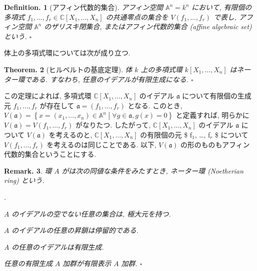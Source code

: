 \documentclass[openany, a4paper, oneside]{jsbook}
\newcounter{enum2}
\renewenvironment{enumerate}{%
\begin{list}%
{%
\arabic{enum2}.\ \,%
}%
{%
\usecounter{enum2}
\setlength{\itemindent}{0pt}%
\setlength{\leftmargin}{15pt}%
\setlength{\rightmargin}{0pt}%
\setlength{\labelsep}{0pt}%
\setlength{\labelwidth}{6pt}%
\setlength{\itemsep}{0pt}%
\setlength{\parsep}{0pt}%
\setlength{\listparindent}{0pt}%
}
}{%
\end{list}%
}
\theoremstyle{break}
\newtheorem{thm}{Theorem.}[section]
\theoremstyle{breakdefn}
\newtheorem{defn}[thm]{Definition.}
\newtheorem{rem}[thm]{Remark.}
\newcommand{\relmiddle}[1]{\mathrel{}\middle#1\mathrel{}}
\newcommand{\set}[2]{\left\{#1 \relmiddle| #2\right\}}
\newcommand{\fin}{\hfill $\square$ \par}
\begin{document}
\begin{defn}[アフィン代数的集合]
アフィン空間 $\mathbb{A}^n = k^n$ において,
有限個の多項式 $f_1, \dots, f_r \in \mathbb{C}[X_1, \dots, X_n]$ の共通零点の集合を
$V (f_1, \dots, f_r)$ で表し, アフィン空間 $\mathbb{A}^n$ のザリスキ閉集合,
またはアフィン代数的集合 (affine algebraic set) という. \fin
\end{defn}\label{waheyhey-algebraic-geometry-guidance2}
体上の多項式環については次が成り立つ.
\begin{thm}[ヒルベルトの基底定理]
体 $k$ 上の多項式環 $k[X_1, \dots, X_n]$ はネーター環である.
すなわち, 任意のイデアルが有限生成になる. \fin
\end{thm}
この定理によれば, 多項式環 $\mathbb{C}[X_1, \dots, X_n]$ のイデアル $\mathfrak{a}$
について有限個の生成元 ${f_1, \dots, f_r}$ が存在して $\mathfrak{a}=(f_1, \dots, f_r)$ となる.
このとき, $V (\mathfrak{a}) = \set{x = (x_1, \dots, x_n) \in \mathbb{A}^n}{\forall g \in \mathfrak{a}, g (x)=0}$
と定義すれば, 明らかに $V ( \mathfrak{a} ) = V (f_1, \dots, f_r)$ がなりたつ.
したがって, $\mathbb{C}[X_1, \dots, X_n]$ のイデアル $\mathfrak{a}$ について $V ( \mathfrak{a} )$ を考えるのと,
$\mathbb{C}[X_1, \dots, X_n]$ の有限個の元 \$ f$_1$, \dots{}, f$_r$ \$ について $V (f_1, \dots, f_r)$ を考えるのは同じことである.
以下, $V ( \mathfrak{a} )$ の形のものもアフィン代数的集合ということにする.
\begin{rem}
環 $A$ がは次の同値な条件をみたすとき, ネーター環 (Noetherian ring) という.
\begin{enumerate}
\item $A$ のイデアルの空でない任意の集合は, 極大元を持つ.
\item $A$ のイデアルの任意の昇鎖は停留的である.
\item $A$ の任意のイデアルは有限生成.
\item 任意の有限生成 $A$ 加群が有限表示 $A$ 加群. \fin
\end{enumerate}
\end{rem}
\end{document}
